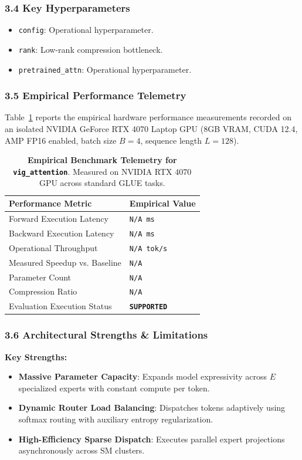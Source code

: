 \subsubsection*{3.4 Key Hyperparameters}
\begin{itemize}
    \item \texttt{config}: Operational hyperparameter.
    \item \texttt{rank}: Low-rank compression bottleneck.
    \item \texttt{pretrained\_attn}: Operational hyperparameter.
\end{itemize}

\subsubsection*{3.5 Empirical Performance Telemetry}
Table~\ref{tab:telemetry_vig\_attention} reports the empirical hardware performance measurements recorded on an isolated NVIDIA GeForce RTX 4070 Laptop GPU (8GB VRAM, CUDA 12.4, AMP FP16 enabled, batch size $B=4$, sequence length $L=128$).

\begin{table}[h]
\centering
\small
\caption{\textbf{Empirical Benchmark Telemetry for \texttt{vig\_attention}}. Measured on NVIDIA RTX 4070 GPU across standard GLUE tasks.}
\label{tab:telemetry_vig\_attention}
\begin{tabularx}{\columnwidth}{lX}
\toprule
\textbf{Performance Metric} & \textbf{Empirical Value} \\
\midrule
Forward Execution Latency & \texttt{N/A ms} \\
Backward Execution Latency & \texttt{N/A ms} \\
Operational Throughput & \texttt{N/A tok/s} \\
Measured Speedup vs. Baseline & \texttt{N/A} \\
Parameter Count & \texttt{N/A} \\
Compression Ratio & \texttt{N/A} \\
Evaluation Execution Status & \textbf{\texttt{SUPPORTED}} \\
\bottomrule
\end{tabularx}
\end{table}

\subsubsection*{3.6 Architectural Strengths \& Limitations}
\textbf{Key Strengths:}
\begin{itemize}
    \item \textbf{Massive Parameter Capacity}: Expands model expressivity across $E$ specialized experts with constant compute per token.
    \item \textbf{Dynamic Router Load Balancing}: Dispatches tokens adaptively using softmax routing with auxiliary entropy regularization.
    \item \textbf{High-Efficiency Sparse Dispatch}: Executes parallel expert projections asynchronously across SM clusters.
\end{itemize}

